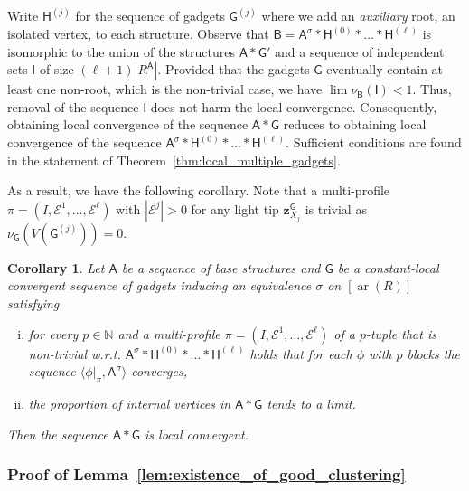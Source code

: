 \documentclass[11pt]{article}
\theoremstyle{plain}
\newtheorem{corollary}[theorem]{Corollary}
\theoremstyle{definition}
\theoremstyle{remark}
\DeclareMathOperator\aritysym{ar}
\newcommand{\arity}[1]{{\aritysym({#1})}}
\newcommand{\N}{\mathbb{N}}
\newcommand{\stonepar}[2]{\langle #1, #2 \rangle}
\newcommand{\strseq}[1]{{\boldsymbol{\mathsf{#1}}}}
\newcommand{\seq}[1]{{\mathsf{#1}}}
\newcommand{\tpl}[1]{{\bm{#1}}}
\begin{document}
Write $\strseq{H}^{(j)}$ for the sequence of gadgets $\strseq{G}^{(j)}$ where we add an \emph{auxiliary} root, an isolated vertex, to each structure.
Observe that $\strseq{B} = \strseq{A}^\sigma*\strseq{H}^{(0)}*\dots*\strseq{H}^{(\ell)}$ is isomorphic to the union of the structures $\strseq{A}*\strseq{G}'$ and a sequence of independent sets $\seq{I}$ of size $(\ell+1)|R^\strseq{A}|$.
Provided that the gadgets $\strseq{G}$ eventually contain at least one non-root, which is the non-trivial case, we have $\lim \nu_\strseq{B}(\seq{I}) < 1$.
Thus, removal of the sequence $\seq{I}$ does not harm the local convergence.
Consequently, obtaining local convergence of the sequence $\strseq{A}*\strseq{G}$ reduces to obtaining local convergence of the sequence $\strseq{A}^\sigma*\strseq{H}^{(0)}*\dots*\strseq{H}^{(\ell)}$.
Sufficient conditions are found in the statement of Theorem~\ref{thm:local_multiple_gadgets}.

As a result, we have the following corollary.
Note that a multi-profile $\pi = (I, \mathcal{E}^1, \dots, \mathcal{E}^\ell)$ with $|\mathcal{E}^j| > 0$ for any light tip $\tpl{z}^\strseq{G}_{X_j}$ is trivial as $\nu_\strseq{G}(V(\strseq{G}^{(j)})) = 0$.

\begin{corollary}\label{cor:loc_fragmented_structures} 
    Let $\strseq{A}$ be a sequence of base structures and $\strseq{G}$ be a constant-local convergent sequence of gadgets inducing an equivalence $\sigma$ on $[\arity{R}]$ satisfying
    \begin{enumerate}[(i)]
        \item for every $p \in \N$ and a multi-profile $\pi = (I, \mathcal{E}^1, \dots, \mathcal{E}^\ell)$ of a $p$-tuple that is non-trivial w.r.t. $\strseq{A}^\sigma*\strseq{H}^{(0)}*\dots*\strseq{H}^{(\ell)}$ holds that for each $\phi$ with $p$ blocks the sequence $\stonepar{\phi|_\pi}{\strseq{A}^\sigma}$ converges,
        \item the proportion of internal vertices in $\strseq{A}*\strseq{G}$ tends to a limit.
    \end{enumerate}
    Then the sequence $\strseq{A}*\strseq{G}$ is local convergent.
\end{corollary}

\subsubsection{Proof of Lemma~\ref{lem:existence_of_good_clustering}}\label{sssec:proof_of_good_clustering}
\end{document}
